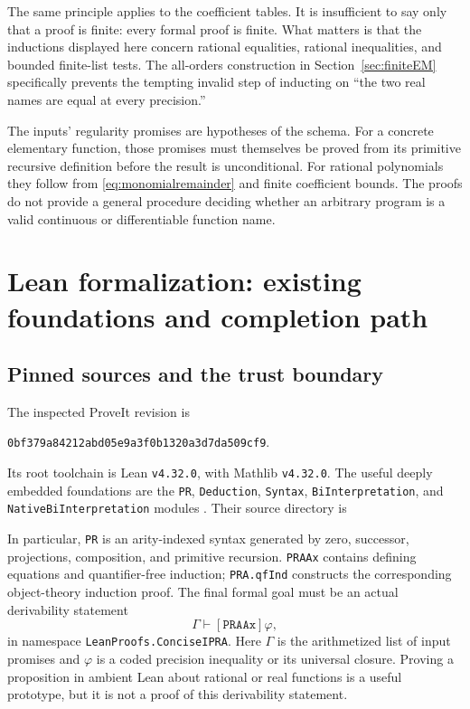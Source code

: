 \documentclass[11pt]{article}
\theoremstyle{definition}
\newcommand{\code}[1]{\texttt{#1}}
\begin{document}
The same principle applies to the coefficient tables.  It is
insufficient to say only that a proof is finite: every formal proof
is finite.  What matters is that the inductions displayed here concern
rational equalities, rational inequalities, and bounded finite-list
tests.  The all-orders construction in Section~\ref{sec:finiteEM}
specifically prevents the tempting invalid step of inducting on
``the two real names are equal at every precision.''

The inputs' regularity promises are hypotheses of the schema.
For a concrete elementary function, those promises must themselves be
proved from its primitive recursive definition before the result is
unconditional.  For rational polynomials they follow from
\eqref{eq:monomialremainder} and finite coefficient bounds.  The
proofs do not provide a general procedure deciding whether an arbitrary
program is a valid continuous or differentiable function name.

\section{Lean formalization: existing foundations and completion path}\label{sec:lean}

\subsection{Pinned sources and the trust boundary}

The inspected ProveIt revision is
\begin{center}
\code{0bf379a84212abd05e9a3f0b1320a3d7da509cf9}.
\end{center}
Its root toolchain is Lean \code{v4.32.0}, with Mathlib
\code{v4.32.0}.  The useful deeply embedded foundations are the
\code{PR}, \code{Deduction}, \code{Syntax}, \code{BiInterpretation},
and \code{NativeBiInterpretation} modules
\cite{prsource,nativesource}.  Their source directory is
\begin{quote}\small
{}
\end{quote}

In particular, \code{PR} is an arity-indexed syntax generated by zero,
successor, projections, composition, and primitive recursion.
\code{PRAAx} contains defining equations and quantifier-free induction;
\code{PRA.qfInd} constructs the corresponding object-theory induction
proof.  The final formal goal must be an actual derivability statement
\[
 \Gamma\vdash[\code{PRAAx}]\varphi,
\]
in namespace \code{LeanProofs.ConciseIPRA}.  Here \(\Gamma\) is the
arithmetized list of input promises and \(\varphi\) is a coded
precision inequality or its universal closure.  Proving a proposition
in ambient Lean about rational or real functions is a useful prototype,
but it is not a proof of this derivability statement.
\end{document}
